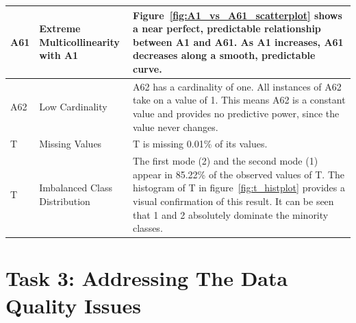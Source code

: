 \documentclass[11pt]{report}
\begin{document}
\begin{longtable}{lp{4cm}p{7cm}}
\midrule
A61 & Extreme Multicollinearity with A1 & Figure~\ref{fig:A1_vs_A61_scatterplot} shows a near perfect, predictable relationship between A1 and A61. As A1 increases, A61 decreases along a smooth, predictable curve. \\
\midrule
A62 & Low Cardinality & A62 has a cardinality of one. All instances of A62 take on a value of 1. This means A62 is a constant value and provides no predictive power, since the value never changes. \\
\midrule
T & Missing Values & T is missing 0.01\% of its values. \\
\midrule
T & Imbalanced Class Distribution & The first mode (2) and the second mode (1) appear in 85.22\% of the observed values of T. The histogram of T in figure~\ref{fig:t_histplot} provides a visual confirmation of this result. It can be seen that 1 and 2 absolutely dominate the minority classes.
\end{longtable}

\section*{Task 3: Addressing The Data Quality Issues}
\end{document}
